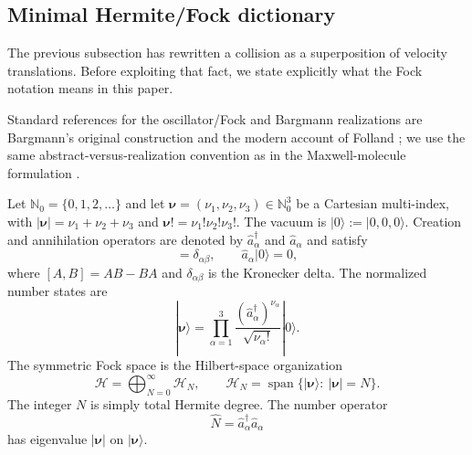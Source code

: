 \documentclass[11pt]{article}
\numberwithin{equation}{section}
\theoremstyle{definition}
\begin{document}
\subsection{Minimal Hermite/Fock dictionary}
The previous subsection has rewritten a collision as a superposition of
velocity translations.  Before exploiting that fact, we state explicitly
what the Fock notation means in this paper.

Standard references for the oscillator/Fock and Bargmann realizations are
Bargmann's original construction and the modern account of Folland
\cite{Bargmann1961,Folland1989}; we use the same abstract-versus-realization
convention as in the Maxwell-molecule formulation \cite{KarlinMaxwell2026}.

Let $\mathbb N_0=\{0,1,2,\ldots\}$ and let
$\boldsymbol{\nu}=(\nu_1,\nu_2,\nu_3)\in\mathbb N_0^3$ be a Cartesian
multi-index, with $|\boldsymbol{\nu}|=\nu_1+\nu_2+\nu_3$ and
$\boldsymbol{\nu}!=\nu_1!\nu_2!\nu_3!$.  The vacuum is
$|0\rangle:=|0,0,0\rangle$.  Creation and annihilation operators are denoted
by $\hat a_\alpha^\dagger$ and $\hat a_\alpha$ and satisfy
\begin{equation}
 [\hat a_\alpha,\hat a_\beta^\dagger]=\delta_{\alpha\beta},
 \qquad
 \hat a_\alpha|0\rangle=0,
\end{equation}
where $[A,B]=AB-BA$ and $\delta_{\alpha\beta}$ is the Kronecker delta.  The
normalized number states are
\begin{equation}
 |\boldsymbol{\nu}\rangle
 =
 \prod_{\alpha=1}^3
 \frac{(\hat a_\alpha^\dagger)^{\nu_\alpha}}{\sqrt{\nu_\alpha!}}
 |0\rangle .
 \label{eq:number_state_dictionary}
\end{equation}
The symmetric Fock space is the Hilbert-space organization
\begin{equation}
 \mathscr H
 =
 \bigoplus_{N=0}^{\infty}\mathscr H_N,
 \qquad
 \mathscr H_N
 =
 \operatorname{span}\{
 |\boldsymbol{\nu}\rangle:\ |\boldsymbol{\nu}|=N
 \}.
 \label{eq:fock_grading_dictionary}
\end{equation}
The integer $N$ is simply total Hermite degree.  The number operator
\begin{equation}
 \widehat N=\hat a_\alpha^\dagger\hat a_\alpha
\end{equation}
has eigenvalue $|\boldsymbol{\nu}|$ on $|\boldsymbol{\nu}\rangle$.
\end{document}
